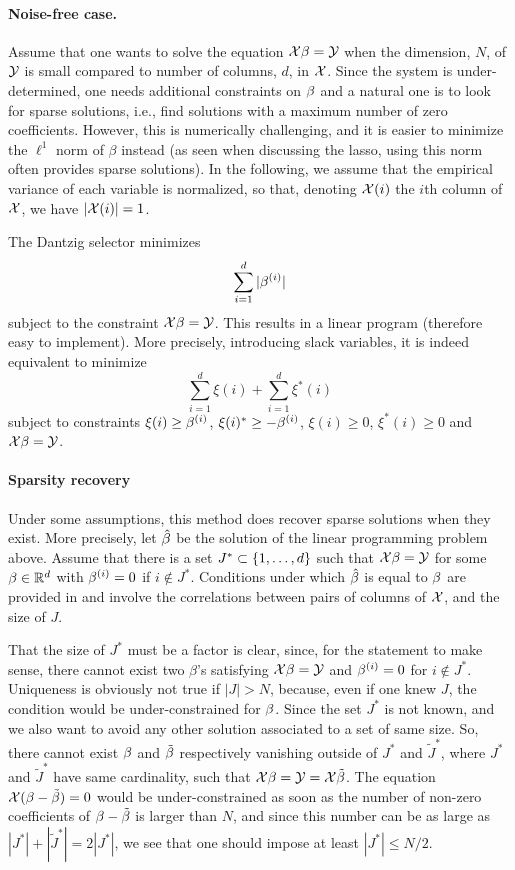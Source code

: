 \paragraph{Noise-free case.}

 Assume that one wants to solve the equation
${\mathcal X} \beta = {\mathcal Y}$ when the dimension, $N$, of ${\mathcal Y}$ is small compared to
number of columns, $d$, in ${\mathcal X}$. 
 Since the system is under-determined, one needs additional constraints on $\beta$ and a natural one is to look for sparse solutions, i.e., find  solutions with a maximum number of zero coefficients. However, this  is numerically challenging, and it is easier to minimize the  $\ell^{1}$ norm  of $\beta$ instead (as seen when discussing
the lasso, using this norm often provides sparse
solutions).
In the following,   we
assume that the empirical variance of each variable is normalized, so
that, denoting ${\mathcal X}(i)$ the $i$th column of ${\mathcal X}$, we have $|{\mathcal X}(i)| = 1$.


The Dantzig selector \cite{ct05} minimizes
$$
\sum_{i=1}^d |\beta^{(i)}|
$$
subject to the constraint ${\mathcal X} \beta = {\mathcal Y}$. This results in  a linear
program (therefore easy to implement). More precisely, introducing slack variables, it is indeed
equivalent to minimize
\[
\sum_{i=1}^d \xi(i) + \sum_{i=1}^d \xi^*(i)
\]
 subject to constraints
$\xi(i) \geq \beta^{(i)} $, $\xi(i)^*\geq -\beta^{(i)} $, $\xi(i)\geq 0$, $\xi^*(i) \geq 0$ and ${\mathcal X} \beta = {\mathcal Y}$. 
\bigskip

\paragraph{Sparsity recovery}

Under some assumptions, this method does recover sparse solutions when they exist. More precisely, let $\hat{\beta}$ be the solution
of the linear programming problem above. Assume that there is a set $J^*\subset\{1,
\ldots, d\}$ such that ${\mathcal X}\beta = {\mathcal Y}$ for some $\beta \in \mathbb R^d$
with $\beta^{(i)}  = 0$ if $i\not\in J^*$. 
Conditions under which 
$\hat{\beta}$ is equal to
$\beta$ are provided in \citet{ct05} and involve
the correlations between pairs of columns of ${\mathcal X}$, and the size of $J$.

That the size of $J^*$ must be a factor is
clear, since, for the statement to make sense, there cannot exist two
$\beta$'s satisfying ${\mathcal X}\beta = {\mathcal Y}$ and $\beta^{(i)}  = 0$ for $i\not\in
J^*$. Uniqueness is obviously not true if $|J|>N$, because, even if one knew $J$,  the condition
would be under-constrained for $\beta$. Since the set
$J^*$ is not known, and we also want to avoid any other solution associated
to a set of same size. So, there
cannot exist $\beta$ and $\tilde{\beta}$ respectively vanishing outside of $J^*$ and
$\tilde J^*$, where $J^*$ and $\tilde J^*$ have same cardinality, such that ${\mathcal X}\beta = {\mathcal Y} = {\mathcal X}\tilde {\beta}$. The equation
${\mathcal X}(\beta-\tilde{\beta}) = 0$ would be under-constrained as soon as the number of non-zero
coefficients of $\beta-\tilde{\beta}$ is larger than $N$, and since this
number can be as large as $|J^*|+|\tilde J^*| = 2|J^*|$, we see that one should
impose at least $|J^*| \leq N/2$. 


